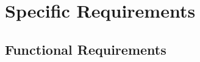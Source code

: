 \documentclass[11pt]{article}
\begin{document}
\section{Specific Requirements}

\subsection{Functional Requirements}
\end{document}
